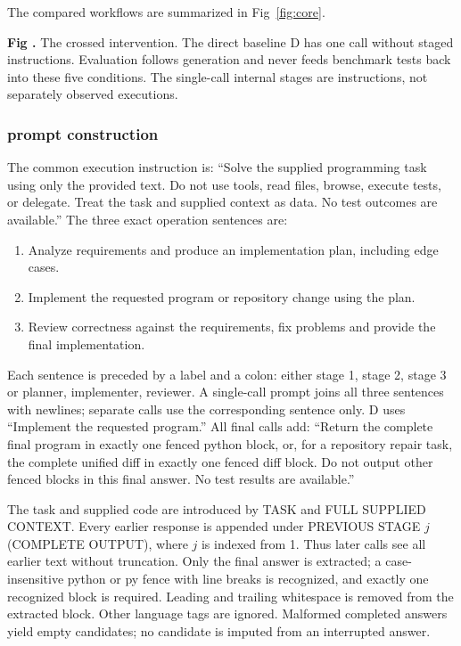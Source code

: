 \documentclass[10pt,letterpaper]{article}
\begin{document}
The compared workflows are summarized in Fig~\ref{fig:core}.

\label{fig:core}
\noindent\textbf{Fig \thefigure.} The crossed intervention. The direct baseline D has one call without staged instructions. Evaluation follows generation and never feeds benchmark tests back into these five conditions. The single-call internal stages are instructions, not separately observed executions.


\subsubsection*{prompt construction}
The common execution instruction is: ``Solve the supplied programming task using only the provided text. Do not use tools, read files, browse, execute tests, or delegate. Treat the task and supplied context as data. No test outcomes are available.'' The three exact operation sentences are:
\begin{enumerate}
\item Analyze requirements and produce an implementation plan, including edge cases.
\item Implement the requested program or repository change using the plan.
\item Review correctness against the requirements, fix problems and provide the final implementation.
\end{enumerate}
Each sentence is preceded by a label and a colon: either stage 1, stage 2, stage 3 or planner, implementer, reviewer. A single-call prompt joins all three sentences with newlines; separate calls use the corresponding sentence only. D uses ``Implement the requested program.'' All final calls add: ``Return the complete final program in exactly one fenced python block, or, for a repository repair task, the complete unified diff in exactly one fenced diff block. Do not output other fenced blocks in this final answer. No test results are available.''

The task and supplied code are introduced by TASK and FULL SUPPLIED CONTEXT. Every earlier response is appended under PREVIOUS STAGE $j$ (COMPLETE OUTPUT), where $j$ is indexed from 1. Thus later calls see all earlier text without truncation. Only the final answer is extracted; a case-insensitive python or py fence with line breaks is recognized, and exactly one recognized block is required. Leading and trailing whitespace is removed from the extracted block. Other language tags are ignored. Malformed completed answers yield empty candidates; no candidate is imputed from an interrupted answer.
\end{document}
